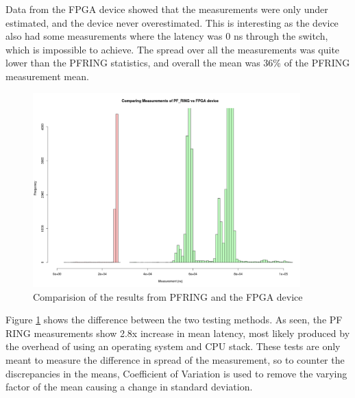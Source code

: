 Data from the FPGA device showed that the measurements were only under estimated, and the device never overestimated.
This is interesting as the device also had some measurements where the latency was 0 ns through the switch, which is 
impossible to achieve. The spread over all the measurements was quite lower than the PF\textunderscore RING 
statistics, and overall the mean was 36\% of the PF\textunderscore RING measurement mean. 

\begin{figure}[H]
    \begin{center}
        \includegraphics[keepaspectratio,height=7.5cm]{Images/Comparision}
        \caption{Comparision of the results from PF\textunderscore RING and the FPGA device}
        \label{fig:comparision}
    \end{center}
\end{figure}

Figure \ref{fig:comparision} shows the difference between the two testing methods. As seen, the PF\textunderscore 
RING measurements show 2.8x increase in mean latency, most likely produced by the overhead of using an operating 
system and CPU stack. These tests are only meant to measure the difference in spread of the measurement, so to 
counter the discrepancies in the means, Coefficient of Variation is used to remove the varying factor of the mean 
causing a change in standard deviation.

